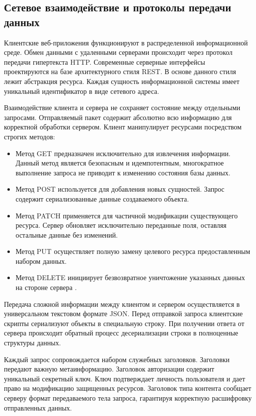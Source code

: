 \documentclass[bachelor, och, pract, times]{SCWorks}
\begin{document}
\subsection{Сетевое взаимодействие и протоколы передачи данных}
Клиентские веб-приложения функционируют в распределенной информационной среде.
Обмен данными с удаленными серверами происходит через протокол передачи
гипертекста HTTP. Современные серверные интерфейсы проектируются на базе
архитектурного стиля REST. В основе данного стиля лежит абстракция ресурса.
Каждая сущность информационной системы имеет уникальный идентификатор в виде
сетевого адреса.

Взаимодействие клиента и сервера не сохраняет состояние между отдельными
запросами. Отправляемый пакет содержит абсолютно всю информацию для корректной
обработки сервером. Клиент манипулирует ресурсами посредством строгих методов:
\begin{itemize}
    \item Метод GET предназначен исключительно для извлечения информации.
      Данный метод является безопасным и идемпотентным, многократное выполнение
      запроса не приводит к изменению состояния базы данных.
    \item Метод POST используется для добавления новых сущностей. Запрос
      содержит сериализованные данные создаваемого объекта.
    \item Метод PATCH применяется для частичной модификации существующего
      ресурса. Сервер обновляет исключительно переданные поля, оставляя
      остальные данные без изменений.
    \item Метод PUT осуществляет полную замену целевого ресурса предоставленным
      набором данных.
    \item Метод DELETE инициирует безвозвратное уничтожение указанных данных на
      стороне сервера \cite{mdn_http_methods}.
\end{itemize}

Передача сложной информации между клиентом и сервером осуществляется в
универсальном текстовом формате JSON. Перед отправкой запроса клиентские
скрипты сериализуют объекты в специальную строку. При получении ответа от
сервера происходит обратный процесс десериализации строки в полноценные
структуры данных.

Каждый запрос сопровождается набором служебных заголовков. Заголовки передают
важную метаинформацию. Заголовок авторизации содержит уникальный секретный
ключ. Ключ подтверждает личность пользователя и дает право на модификацию
защищенных ресурсов. Заголовок типа контента сообщает серверу формат
передаваемого тела запроса, гарантируя корректную расшифровку отправленных
данных.
\end{document}
